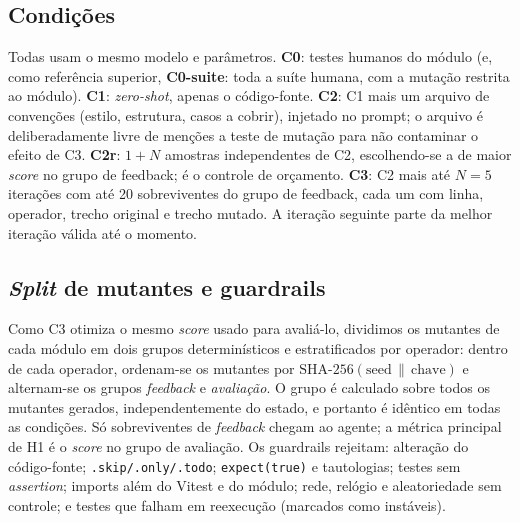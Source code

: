 \documentclass[12pt]{article}
\begin{document}
\begin{table}[t]
\centering\small

\caption{Módulos incluídos. ``Mutantes válidos'' exclui erros de compilação/execução. MS: \textit{mutation score} da
suíte humana completa do repositório, medido no commit fixado.}
\label{tab:sujeitos}
\end{table}

\subsection{Condições}

Todas usam o mesmo modelo e parâmetros. \textbf{C0}: testes humanos do módulo (e, como referência superior,
\textbf{C0-suite}: toda a suíte humana, com a mutação restrita ao módulo). \textbf{C1}: \textit{zero-shot}, apenas o
código-fonte. \textbf{C2}: C1 mais um arquivo de convenções (estilo, estrutura, casos a cobrir), injetado no prompt;
o arquivo é deliberadamente livre de menções a teste de mutação para não contaminar o efeito de C3. \textbf{C2r}:
$1+N$ amostras independentes de C2, escolhendo-se a de maior \textit{score} no grupo de feedback; é o controle de
orçamento. \textbf{C3}: C2 mais até $N=5$ iterações com até 20 sobreviventes do grupo de feedback, cada um com linha,
operador, trecho original e trecho mutado. A iteração seguinte parte da melhor iteração válida até o momento.

\subsection{\textit{Split} de mutantes e guardrails}

Como C3 otimiza o mesmo \textit{score} usado para avaliá-lo, dividimos os mutantes de cada módulo em dois grupos
determinísticos e estratificados por operador: dentro de cada operador, ordenam-se os mutantes por
$\text{SHA-256}(\text{seed}\,\|\,\text{chave})$ e alternam-se os grupos \textit{feedback} e \textit{avaliação}. O grupo
é calculado sobre todos os mutantes gerados, independentemente do estado, e portanto é idêntico em todas as condições. Só
sobreviventes de \textit{feedback} chegam ao agente; a métrica principal de H1 é o \textit{score} no grupo de avaliação.
Os guardrails rejeitam: alteração do código-fonte; \texttt{.skip/.only/.todo}; \texttt{expect(true)} e tautologias;
testes sem \textit{assertion}; imports além do Vitest e do módulo; rede, relógio e aleatoriedade sem controle; e
testes que falham em reexecução (marcados como instáveis).
\end{document}
